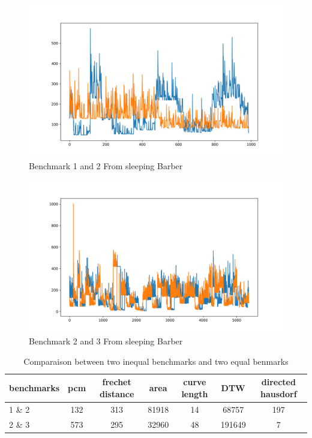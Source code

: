 \documentclass{article}
\begin{document}
\begin{figure}[h]
    \centering
    \includegraphics[width=1\textwidth]{plot_0.png}
    \caption{Benchmark 1 and 2 From sleeping Barber}
    \label{fig:mesh1}
\end{figure}


\begin{figure}[h]
    \centering
    \includegraphics[width=1\textwidth]{plot_1.png}
    \caption{Benchmark 2 and 3 From sleeping Barber}
    \label{fig:mesh1}
\end{figure}

\begin{table}[h!]
\begin{tabular}{|l|c|c|c|c|c|c|}
   \hline
   benchmarks & pcm & frechet distance & area & curve length & DTW & directed hausdorf \\
   \hline
   1 \&  2 & 132 & 313 & 81918 & 14 & 68757 & 197\\
   \hline
   2 \& 3 & 573 & 295 & 32960 & 48 & 191649 & 7 \\
   \hline
\end{tabular} \\ 
\caption{Comparaison between two inequal benchmarks and two equal benmarks}
\end{table}
\end{document}
